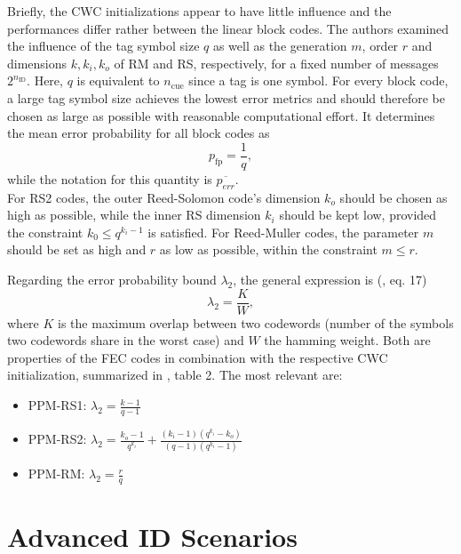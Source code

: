 \documentclass[english,BCOR=4mm,cdfont=false]{tudscrreprt} %
\begin{document}
Briefly, the CWC initializations appear to have little influence and the performances differ rather between the linear block codes. The authors examined the influence of the tag symbol size $q$ as well as the generation $m$, order $r$ and dimensions $k, k_i, k_o$ of RM and RS, respectively, for a fixed number of messages $2^{n_\text{ID}}$. Here, $q$ is equivalent to $n_\text{cue}$ since a tag is one symbol.
For every block code, a large tag symbol size achieves the lowest error metrics and should therefore be chosen as large as possible with reasonable computational effort. It determines the mean error probability for all block codes as 
\begin{equation}
    p_\text{fp} = \frac{1}{q},
\end{equation} 
while the notation for this quantity is $\overline{p_{err}}$.\\
For RS2 codes, the outer Reed-Solomon code's dimension $k_o$ should be chosen as high as possible, while the inner RS dimension $k_i$ should be kept low, provided the constraint $k_0 \leq q^{k_i - 1}$ is satisfied. For Reed-Muller codes, the parameter $m$ should be set as high and $r$ as low as possible, within the constraint $m \leq r$.

Regarding the error probability bound $\lambda_2$, the general expression is (\cite{ID_Codes_Topical_Review}, eq. 17)
\begin{equation}
    \lambda_2 = \frac{K}{W}, 
\end{equation}
where $K$ is the maximum overlap between two codewords (number of the symbols two codewords share in the worst case) and $W$ the hamming weight. Both are properties of the FEC codes in combination with the respective CWC initialization, summarized in \cite{ID_Codes_Topical_Review}, table 2. The most relevant are:
\begin{itemize}
    \item PPM-RS1: $\lambda_2 = \frac{k-1}{q-1}$
    \item PPM-RS2: $\lambda_2 = \frac{k_o - 1}{q^{k_i}} + \frac{(k_i - 1)(q^{k_i} - k_o)}{(q-1)(q^{k_i} - 1)}$
    \item PPM-RM: $\lambda_2 = \frac{r}{q}$
\end{itemize}

\section{Advanced ID Scenarios}
\label{sec:VerIdprob}
\end{document}
